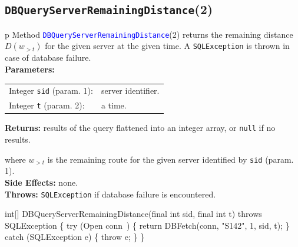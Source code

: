 \subsection{{\tt{}\protect{}DBQueryServerRemainingDistance}(2)}
\begin{tabular}{p{\textwidth}}
\toprule
{}
Method \textcolor{blue}{{\tt{}\protect{}DBQueryServerRemainingDistance}}(2) returns the
remaining distance $D(w_{>t})$ for the given server at the given time.
A {\tt{}SQLException} is thrown in case of database failure.\\
\midrule
\textbf{Parameters:} \\
\begin{tabular}{lp{116mm}}
Integer {\tt{}sid} (param. 1):&server identifier.\\
Integer {\tt{}t} (param. 2):&a time.\\
\end{tabular}
\textbf{Returns:} results of the query flattened into an integer array,
or {\tt{}null} if no results.


where $w_{>t}$ is the remaining route for the given server identified by {\tt{}sid} (param. 1).\\
\textbf{Side Effects:} none.\\
\textbf{Throws:} {\tt{}SQLException} if database failure is encountered.\\
\bottomrule
\end{tabular}
\nwenddocs{}\endmoddef{}
int[] DBQueryServerRemainingDistance(final int sid, final int t)
throws SQLException \{
  try (\LA{}Open \code{}conn\edoc{}~{\nwtagstyle{}}\RA{}) \{
    return DBFetch(conn, "S142", 1, sid, t);
  \} catch (SQLException e) \{
    throw e;
  \}
\}
\eatline
